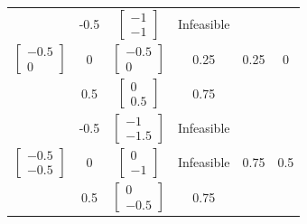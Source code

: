 \begin{latin}
\begin{longtable}{|c|c|c|c|c|c|}
		&              -0.5          &$\begin{bmatrix} -1 \\ -1 \end{bmatrix}$      & Infeasible                        &      &     \\  \cline{2-4} 
		\multirow{-3}{*}{$\begin{bmatrix} -0.5 \\ 0 \end{bmatrix}$}&      0                  &$\begin{bmatrix} -0.5 \\ 0 \end{bmatrix}$      &      0.25                  &  0.25          &     0   \\  \cline{2-4} 
		&              0.5          &$\begin{bmatrix} 0 \\ 0.5 \end{bmatrix}$      &    0.75                &                 &     \\  \cline{2-4} \hline	
		
		& -0.5 &$\begin{bmatrix} -1 \\ -1.5 \end{bmatrix}$      & Infeasible                        &            &        \\ \cline{2-4}
		\multirow{-3}{*}{$\begin{bmatrix} -0.5 \\ -0.5 \end{bmatrix}$}& 0   &$\begin{bmatrix} 0 \\ -1 \end{bmatrix}$      & Infeasible                        &    0.75       &  0.5	      \\ \cline{2-4}
		& 0.5 &$\begin{bmatrix} 0 \\ -0.5 \end{bmatrix}$      &    0.75                    &                &      \\ \hline
		
	\end{longtable}
\end{latin}

	\newpage
